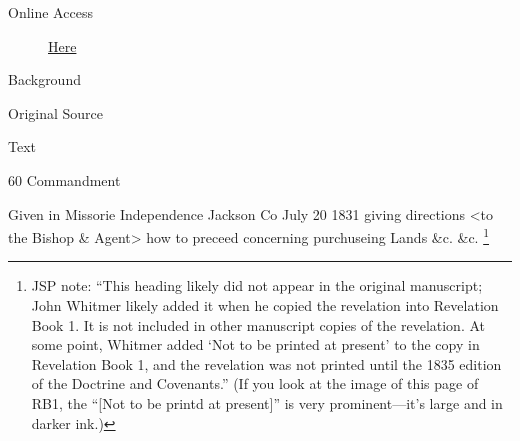 			\begin{description}
				\item[Online Access] \href{https://www.josephsmithpapers.org/paper-summary/revelation-20-july-1831-dc-57/1}{Here}
			\end{description}
			
			\begin{description}
				\item[Background]
			\end{description}
			
			
			\begin{description}
				\item[Original Source]
			\end{description}
			
			
			\begin{description}
				\item[Text]
			\end{description}
			
				\begin{tightcenter}
				60 Commandment
				\end{tightcenter}
				
				Given in Missorie Independence Jackson Co July 20 1831 giving directions <to the Bishop \& Agent> how to preceed concerning purchuseing Lands \&c. \&c.%
					\footnote{%
						JSP note: ``This heading likely did not appear in the original manuscript; John Whitmer likely added it when he copied the revelation into Revelation Book 1. It is not included in other manuscript copies of the revelation. At some point, Whitmer added `Not to be printed at present' to the copy in Revelation Book 1, and the revelation was not printed until the 1835 edition of the Doctrine and Covenants.'' (If you look at the image of this page of RB1, the ``[Not to be printd at present]'' is very prominent---it's large and in darker ink.)
						}
				
